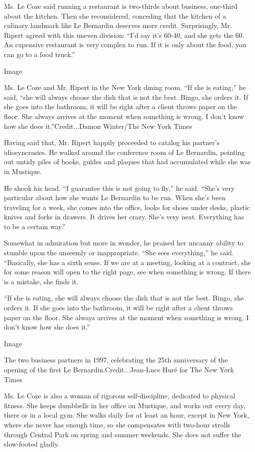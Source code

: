 Ms. Le Coze said running a restaurant is two-thirds about business,
one-third about the kitchen. Then she reconsidered, conceding that the
kitchen of a culinary landmark like Le Bernardin deserves more credit.
Surprisingly, Mr. Ripert agreed with this uneven division: ``I'd say
it's 60-40, and she gets the 60. An expensive restaurant is very complex
to run. If it is only about the food, you can go to a food truck.''

Image

Ms. Le Coze and Mr. Ripert in the New York dining room. ``If she is
eating,'' he said, ``she will always choose the dish that is not the
best. Bingo, she orders it. If she goes into the bathroom, it will be
right after a client throws paper on the floor. She always arrives at
the moment when something is wrong. I don't know how she does
it.''Credit...Damon Winter/The New York Times

Having said that, Mr. Ripert happily proceeded to catalog his partner's
idiosyncrasies. He walked around the conference room of Le Bernardin,
pointing out untidy piles of books, guides and plaques that had
accumulated while she was in Mustique.

He shook his head. ``I guarantee this is not going to fly,'' he said.
``She's very particular about how she wants Le Bernardin to be run. When
she's been traveling for a week, she comes into the office, looks for
shoes under desks, plastic knives and forks in drawers. It drives her
crazy. She's very neat. Everything has to be a certain way.''

Somewhat in admiration but more in wonder, he praised her uncanny
ability to stumble upon the unseemly or inappropriate. ``She sees
everything,'' he said. ``Basically, she has a sixth sense. If we are at
a meeting, looking at a contract, she for some reason will open to the
right page, see when something is wrong. If there is a mistake, she
finds it.

``If she is eating, she will always choose the dish that is not the
best. Bingo, she orders it. If she goes into the bathroom, it will be
right after a client throws paper on the floor. She always arrives at
the moment when something is wrong. I don't know how she does it.''

Image

The two business partners in 1997, celebrating the 25th anniversary of
the opening of the first Le Bernardin.Credit...Jean-Luce Huré for The
New York Times

Ms. Le Coze is also a woman of rigorous self-discipline, dedicated to
physical fitness. She keeps dumbbells in her office on Mustique, and
works out every day, there or in a local gym. She walks daily for at
least an hour, except in New York, where she never has enough time, so
she compensates with two-hour strolls through Central Park on spring and
summer weekends. She does not suffer the slow-footed gladly.

